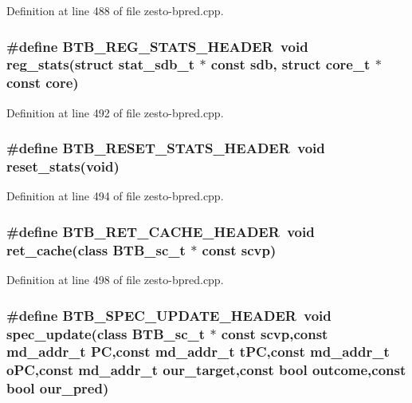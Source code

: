 Definition at line 488 of file zesto-bpred.cpp.
\subsubsection[{BTB\_\-REG\_\-STATS\_\-HEADER}]{\setlength{\rightskip}{0pt plus 5cm}\#define BTB\_\-REG\_\-STATS\_\-HEADER~void reg\_\-stats(struct {\bf stat\_\-sdb\_\-t} $\ast$ const sdb, struct {\bf core\_\-t} $\ast$ const core)}\label{zesto-bpred_8cpp_2e4abd6a64bc4c03bf69e9a10f62af1e}




Definition at line 492 of file zesto-bpred.cpp.
\subsubsection[{BTB\_\-RESET\_\-STATS\_\-HEADER}]{\setlength{\rightskip}{0pt plus 5cm}\#define BTB\_\-RESET\_\-STATS\_\-HEADER~void reset\_\-stats(void)}\label{zesto-bpred_8cpp_b1d02894201a9d139ade2d716b909fcf}




Definition at line 494 of file zesto-bpred.cpp.
\subsubsection[{BTB\_\-RET\_\-CACHE\_\-HEADER}]{\setlength{\rightskip}{0pt plus 5cm}\#define BTB\_\-RET\_\-CACHE\_\-HEADER~void ret\_\-cache(class {\bf BTB\_\-sc\_\-t} $\ast$ const scvp)}\label{zesto-bpred_8cpp_7f336f364d60c873d2c2cae0cb0f427f}




Definition at line 498 of file zesto-bpred.cpp.
\subsubsection[{BTB\_\-SPEC\_\-UPDATE\_\-HEADER}]{\setlength{\rightskip}{0pt plus 5cm}\#define BTB\_\-SPEC\_\-UPDATE\_\-HEADER~void spec\_\-update(class {\bf BTB\_\-sc\_\-t} $\ast$ const scvp,const {\bf md\_\-addr\_\-t} PC,const {\bf md\_\-addr\_\-t} tPC,const {\bf md\_\-addr\_\-t} oPC,const {\bf md\_\-addr\_\-t} our\_\-target,const bool outcome,const bool our\_\-pred)}\label{zesto-bpred_8cpp_cdd85040ace8e078d61f330b08e25a73}




